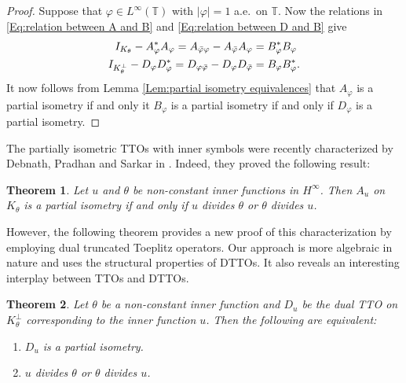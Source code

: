 \documentclass[12pt]{amsart}
\newcommand{\T}{\mathbb{T}}
\theoremstyle{definition}
\theoremstyle{plain}
\newtheorem{thm}{Theorem}[section]
\theoremstyle{definition}
\numberwithin{equation}{section}
\let\phi=\varphi
\begin{document}
	
\begin{proof}
Suppose that $\phi\in L^{\infty}(\T)$ with $|\phi|=1$ a.e.\ on $\T$. Now the relations in \eqref{Eq:relation between A and B} and \eqref{Eq:relation between D and B} give
\begin{align*}
I_{K_{\theta}}-A_{\phi}^*A_{\phi} = A_{\Bar{\phi}\phi}-A_{\Bar{\phi}}A_{\phi} &= B_{\phi}^*B_{\phi}\\
I_{K_{\theta}^{\perp}}-D_{\phi}D_{\phi}^* = D_{\phi\Bar{\phi}}-D_{\phi}D_{\Bar{\phi}} &= B_{\phi}B_{\phi}^*.
\end{align*}
It now follows from Lemma \ref*{Lem:partial isometry equivalences} that $A_{\phi}$ is a partial isometry if and only it $B_{\phi}$ is a partial isometry if and only if $D_{\phi}$ is a partial isometry.
\end{proof}
	
	
	
	

	
The partially isometric TTOs with inner symbols were recently characterized by Debnath, Pradhan and Sarkar in \cite{DEBNATH-PRADHAN-SARKAR}. Indeed, they proved the following result: 
\begin{thm}
Let $u$ and $\theta$ be non-constant inner functions in $H^\infty$. Then $A_u$ on $K_\theta$ is a partial isometry if and only if $u$ divides $\theta$ or $\theta$ divides $u$.
\end{thm}
		

However, the following theorem provides a new proof of this characterization by employing dual truncated Toeplitz operators. Our approach is more algebraic in nature and uses the structural properties of DTTOs. It also reveals an interesting interplay between TTOs and DTTOs.



\begin{thm}\label{Thm:Du partial isometry characterization}
Let $\theta$ be a non-constant inner function and $D_u$ be the dual TTO on $K_{\theta}^{\perp}$ corresponding to the inner function $u$. Then the following are equivalent:
\begin{enumerate}
\item $D_u$ is a partial isometry.
\item $u$ divides $\theta$ or $\theta$ divides $u$.
\end{enumerate}
\end{thm}
	
	
	
\end{document}
